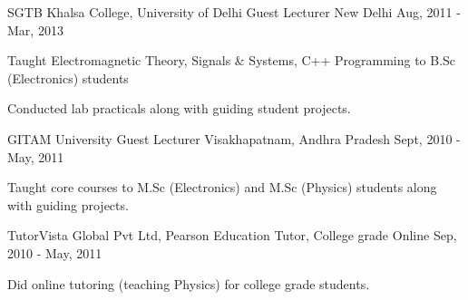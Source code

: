 

\begin{cventries}


  \cventry
    {SGTB Khalsa College, University of Delhi} %
    {Guest Lecturer} %
    {New Delhi} %
    {Aug, 2011 - Mar, 2013} %
    {
      \begin{cvitems} %
        \item {Taught Electromagnetic Theory, Signals \& Systems, C++ Programming to B.Sc (Electronics) students}
        \item {Conducted lab practicals along with guiding student projects.}
      \end{cvitems}
    }

  \cventry
    {GITAM University} %
    {Guest Lecturer} %
    {Visakhapatnam, Andhra Pradesh} %
    {Sept, 2010 - May, 2011} %
    {
      \begin{cvitems} %
        \item {Taught core courses to M.Sc (Electronics) and M.Sc (Physics) students along with guiding projects.}
      \end{cvitems}
    }
  \cventry
    {TutorVista Global Pvt Ltd, Pearson Education} %
    {Tutor, College grade} %
    {Online} %
    {Sep, 2010 - May, 2011} %
    {
      \begin{cvitems} %
        \item {Did online tutoring (teaching Physics) for college grade students.}
      \end{cvitems}
    }


\end{cventries}
